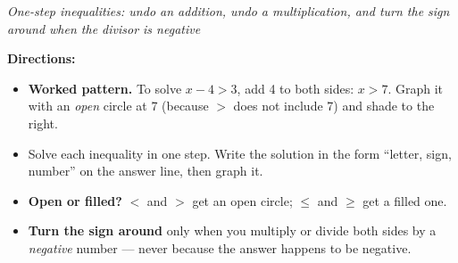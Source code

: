\documentclass[12pt]{article}
\begin{document}

\begin{center}
\textit{One-step inequalities: undo an addition, undo a multiplication, and turn
the sign around when the divisor is negative}
\end{center}

\noindent\textbf{Directions:}
\begin{itemize}
  \item \textbf{Worked pattern.} To solve $x - 4 > 3$, add 4 to both sides:
        $x > 7$. Graph it with an \emph{open} circle at 7 (because $>$ does not
        include 7) and shade to the right.
  \item Solve each inequality in one step. Write the solution in the form
        ``letter, sign, number'' on the answer line, then graph it.
  \item \textbf{Open or filled?} $<$ and $>$ get an open circle; $\le$ and
        $\ge$ get a filled one.
  \item \textbf{Turn the sign around} only when you multiply or divide both
        sides by a \emph{negative} number --- never because the answer happens
        to be negative.
\end{itemize}


\end{document}
